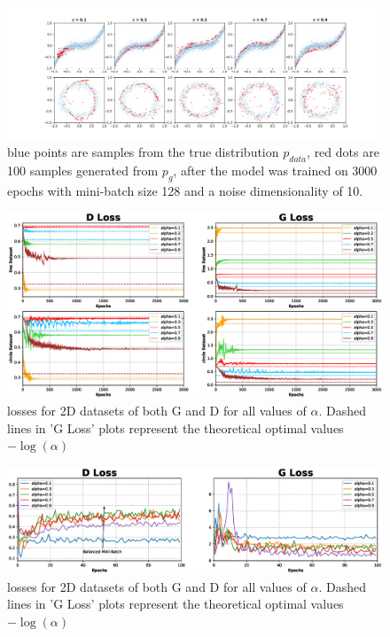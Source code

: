 \begin{figure}
	\includegraphics*[width=\textwidth]{./plots/pdf_2D_fit.png}
	\caption{blue points are samples from the true distribution $p_{data}$, red dots are 100 samples generated from $p_g$, after the model was trained on 3000 epochs with mini-batch size 128 and a noise dimensionality of 10.}
	\label{fig:2Dplots}
\end{figure}
\begin{figure}
	\includegraphics*[width=\textwidth]{./plots/losses_2D.eps}
	\caption{losses for 2D datasets of both G and D for all values of $\alpha$. Dashed lines in 'G Loss' plots represent the theoretical optimal values $-\log(\alpha)$}
	\label{fig:2Dlosses}
\end{figure}
\begin{figure}
	\includegraphics*[width=\textwidth]{./plots/losses_MNIST.eps}
	\caption{losses for 2D datasets of both G and D for all values of $\alpha$. Dashed lines in 'G Loss' plots represent the theoretical optimal values $-\log(\alpha)$}
	\label{fig:MNISTlosses}
\end{figure}
